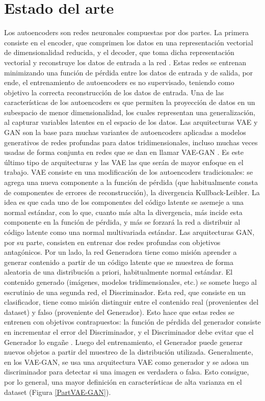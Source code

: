 \documentclass[spanish]{article}
\begin{document}
\section{Estado del arte}
Los autoencoders son redes neuronales compuestas por dos partes. La primera consiste en el encoder, que
comprimen los datos en una representación vectorial de dimensionalidad reducida, y el decoder, que toma dicha
representación vectorial y reconstruye los datos de entrada a la red \cite{Foster2019}. Estas redes se
entrenan minimizando una función de pérdida entre los datos de entrada y de salida, por ende, el
entrenamiento de autoencoders es no supervisado, teniendo como objetivo la correcta reconstrucción de los
datos de entrada. Una de las características de los autoencoders es que permiten la proyección de datos en un
subespacio de menor dimensionalidad, los cuales representan una generalización, al capturar variables
latentes en el espacio de los datos.
Las arquitecturas VAE \cite{Kingma2013} y GAN \cite{Goodfellow2014} son la base para muchas variantes de
autoencoders aplicadas a modelos generativos de redes profundas para datos tridimensionales, incluso muchas
veces usadas de forma conjunta en redes que se dan en llamar VAE-GAN \cite{Li2019}. Es este último tipo de
arquitecturas y las VAE las que serán de mayor enfoque en el trabajo. VAE consiste en una modificación de
los autoencoders tradicionales: se agrega una nueva componente a la función de pérdida (que habitualmente
consta de componentes de errores de reconstrucción), la divergencia Kullback-Leibler. La idea es que cada
uno de los componentes del código latente se asemeje a una normal estándar, con lo que, cuanto más alta la
divergencia, más incide esta componente en la función de pérdida, y más se forzará la red a distribuir al
código latente como una normal multivariada estándar. Las arquitecturas GAN, por su parte, consisten en
entrenar dos redes profundas con objetivos antagónicos. Por un lado, la red Generadora tiene como misión
aprender a generar  contenido a partir de un código latente que se muestrea de forma aleatoria de una
distribución a priori, habitualmente normal estándar. El contenido generado (imágenes, modelos
tridimensionales, etc.) se somete luego al escrutinio de una segunda red, el Discriminador. Esta red, que
consiste en un clasificador, tiene como misión distinguir entre el contenido real (provenientes del
dataset) y falso (proveniente del Generador). Esto hace que estas redes se entrenen con objetivos
contrapuestos: la función de pérdida del generador consiste en incrementar el error del Discriminador,
y el Discriminador debe evitar que el Generador lo engañe \cite{goodfellow2016deep}. Luego del
entrenamiento, el Generador puede generar nuevos objetos a partir del muestreo de la distribución
utilizada. Generalmente, en los VAE-GAN, se usa una arquitectura VAE como generador y se adosa un
discriminador para detectar si una imagen es verdadera o falsa. Esto consigue, por lo general, una mayor
definición en características de alta varianza en el dataset (Figura \ref{PartVAE-GAN}).
\end{document}
